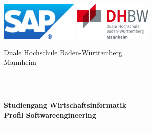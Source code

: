 \documentclass[fontsize=12pt,listof=totoc]{scrreprt}
\newif\ifsperr
\newif\ifroman
\begin{document}
	\ifroman
		\pagenumbering{Roman}
	\fi
	\hypertarget{top}{}
	\bookmark[dest=top]{\Titel}
	\begin{titlepage}
		\includegraphics[height=70px]{img/firma}
		\hfill
		\includegraphics[height=70px]{img/dhbw}
		\begin{center}
			\large{Duale Hochschule Baden-Württemberg\\
			Mannheim}\\
			\Arbeitstyp\\
			\vspace{20px}
			\begin{onehalfspace}
				{\LARGE\sffamily\Titel\\}
			\end{onehalfspace}
			\vspace{30px}
			\normalsize
			\textbf{Studiengang Wirtschaftsinformatik}\\
			\textbf{\small{Profil Softwareengineering}}\\
			\ifsperr
				\textcolor{red}{\textbf{-Sperrvermerk-}}\\
			\fi
			\vfill
		\end{center}
		\begin{tabular}{ll}
			\Titelblatt{}
		\end{tabular}
	\end{titlepage}
	
	\ifsperr
		\newpage
		\hypertarget{nda}{}
		\thispagestyle{scrplain}
\end{document}

